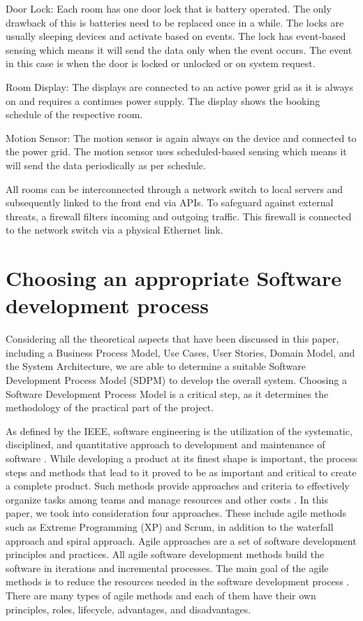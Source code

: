 \documentclass[article,onecolumn]{IEEEtran}
\begin{document}
	Door Lock: Each room has one door lock that is battery operated. The only drawback of this is batteries need to be replaced once in a while. The locks are usually sleeping devices and activate based on events. The lock has event-based sensing which means it will send the data only when the event occurs. The event in this case is when the door is locked or unlocked or on system request.

	Room Display: The displays are connected to an active power grid as it is always on and requires a continues power supply. The display shows the booking schedule of the respective room.

	Motion Sensor: The motion sensor is again always on the device and connected to the power grid. The motion sensor uses scheduled-based sensing which means it will send the data periodically as per schedule.

	All rooms can be interconnected through a network switch to local servers and subsequently linked to the front end via APIs. To safeguard against external threats, a firewall filters incoming and outgoing traffic. This firewall is connected to the network switch via a physical Ethernet link.

\newpage %


\section{Choosing an appropriate Software development process}

Considering all the theoretical aspects that have been discussed in this paper, including a Business Process Model, Use Cases, User Stories, Domain Model, and the System Architecture, we are able to determine a suitable Software Development Process Model (SDPM) to develop the overall system. Choosing a Software Development Process Model is a critical step, as it determines the methodology of the practical part of the project.

As defined by the IEEE, software engineering is the utilization of the systematic, disciplined, and quantitative approach to development and maintenance of software \cite{a3}. While developing a product at its finest shape is important, the process steps and methods that lead to it proved to be as important and critical to create a complete product. Such methods provide approaches and criteria to effectively organize tasks among teams and manage resources and other costs \cite{a4}. In this paper, we took into consideration four approaches. These include agile methods such as Extreme Programming (XP) and Scrum, in addition to the waterfall approach and spiral approach.
Agile approaches are a set of software development principles and practices. All agile software development methods build the software in iterations and incremental processes. The main goal of the agile methods is to reduce the resources needed in the software development process \cite{a4}. There are many types of agile methods and each of them have their own principles, roles, lifecycle, advantages, and disadvantages.
\end{document}
